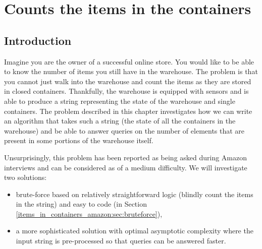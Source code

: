 %

\chapter{Counts the items in the containers}
\label{ch:items_in_containers_amazon}
\section*{Introduction}
Imagine you are the owner of a successful online store. You would like to be able to know
the number of items you still have in the warehouse. The problem is that you cannot just walk into
the warehouse and count the items as they are stored in closed containers. Thankfully, the warehouse
is equipped with sensors and is able to produce a string representing the state of the warehouse
and single containers. The problem described in this chapter investigates how we can write an
algorithm that takes such a string (the state of all the containers in the warehouse) and be able to
answer queries on the number of elements that are present in some portions of the warehouse itself. 

Unsurprisingly, this problem has been reported as being asked during Amazon interviews and can be considered as of a medium difficulty. We will investigate two solutions:
\begin{itemize}
	\item brute-force based on relatively straightforward logic (blindly count the
	 items in the string) and easy to code (in Section
	 \ref{items_in_containers_amazon:sec:bruteforce}),
	\item a more sophisticated solution with optimal asymptotic complexity where the input string is
	pre-processed so that queries can be answered faster.
\end{itemize}



